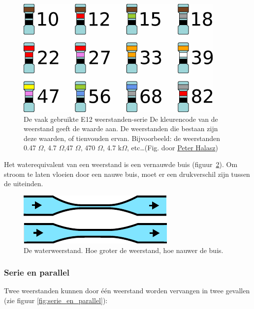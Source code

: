 \documentclass{article}
\begin{document}
			\begin{figure}[htbp]
				\centering
				\includegraphics{e12}
				\caption{
				De vaak gebruikte E12 weerstanden-serie
				De kleurencode van de weerstand geeft de waarde aan. De weerstanden die bestaan zijn deze waarden, of tienvouden ervan. Bijvoorbeeld: de weerstanden 0.47 $\Omega$,  4.7 $\Omega$,47 $\Omega$, 470 $\Omega$, 4.7 k$\Omega$, etc\ldots (Fig. door \href{https://en.wikipedia.org/wiki/User:Pengo}{Peter Halasz})
				} 
				\label{fig:e12}
			\end{figure}

			Het waterequivalent van een weerstand is een vernauwde buis (figuur~\ref{fig:waterweerstand}). Om  stroom te laten vloeien door een nauwe buis, moet er een drukverschil zijn tussen de uiteinden.

			\begin{figure}[htbp]
				\centering
				\includegraphics{waterweerstand}
				\caption{De waterweerstand. Hoe groter de weerstand, hoe nauwer de buis.}
				\label{fig:waterweerstand}
			\end{figure}

		\subsubsection{Serie en parallel}
			\label{sssec:serie_en_parallel}
			Twee weerstanden kunnen door \'e\'en  weerstand worden vervangen in twee gevallen (zie figuur \ref{fig:serie_en_parallel}):
\end{document}
